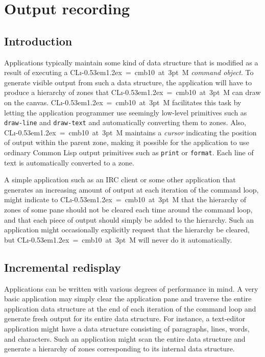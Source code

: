 \documentclass{report}
\def\Tiny{ \font\Tinyfont = cmb10 at 3pt \relax  \Tinyfont}
\def\cl{Common Lisp}
\def\clim{\textsf{CL{\i}\kern-0.53em\raise1.2ex\hbox{\Tiny 3}M}}
\def\code#1{\texttt{#1}}
\begin{document}
\chapter{Output recording}

\section{Introduction}

Applications typically maintain some kind of data structure that is
modified as a result of executing a \clim{} \emph{command object}.  To
generate visible output from such a data structure, the application
will have to produce a hierarchy of zones that \clim{} can draw on
the canvas.  \clim{} facilitates this task by letting the application
programmer use seemingly low-level primitives such as \code{draw-line}
and \code{draw-text} and automatically converting them to zones.
Also, \clim{} maintains a \emph{cursor} indicating the position of
output within the parent zone, making it possible for the
application to use ordinary \cl{} output primitives such as
\code{print} or \code{format}.  Each line of text is automatically
converted to a zone. 

A simple application such as an IRC client or some other application
that generates an increasing amount of output at each iteration of the
command loop, might indicate to \clim{} that the hierarchy of zones
of some pane should not be cleared each time around the command loop,
and that each piece of output should simply be added to the
hierarchy.  Such an application might occasionally explicitly request
that the hierarchy be cleared, but \clim{} will never do it
automatically. 

\section{Incremental redisplay}

Applications can be written with various degrees of performance in
mind.  A very basic application may simply clear the application pane
and traverse the entire application data structure at the end of each
iteration of the command loop and generate fresh output for its entire
data structure.  For instance, a text-editor application might have a
data structure consisting of paragraphs, lines, words, and characters.
Such an application might scan the entire data structure and generate
a hierarchy of zones corresponding to its internal data structure. 
\end{document}
